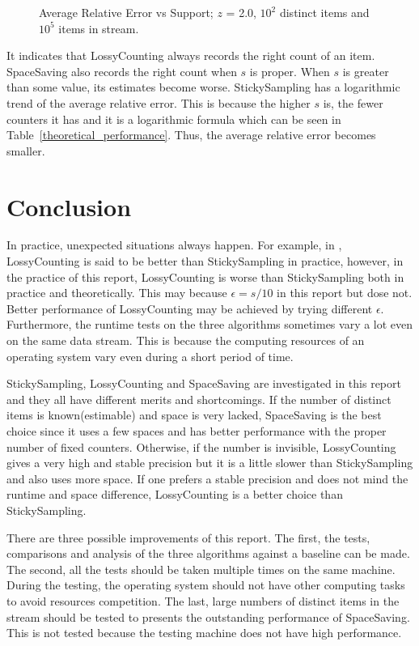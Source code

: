 \documentclass[10pt]{article}
\begin{document}
 \begin{figure}[H]
      \centering
     \begin{subfigure}[b]{0.6\textwidth}
      \centering
      \end{subfigure}
      \caption{Average Relative Error vs Support; $z$ = 2.0, $10^2$ distinct items and $10^5$ items in stream.}  
      \label{AverageRelativeErrorSupport}
 \end{figure}
 It indicates that 
 LossyCounting always records the right count of an item.
 SpaceSaving also records the right count when $s$ is proper. 
 When $s$ is greater than some value, its estimates become worse.
 StickySampling has a logarithmic trend of the average relative error.
 This is because the higher $s$ is, the fewer counters it has 
 and it is a logarithmic formula which can be seen in Table~\ref{theoretical_performance}. 
 Thus, the average relative error becomes smaller.

 \section{Conclusion}\label{conclusion}
 In practice, unexpected situations always happen. 
 For example, in \cite{stickylossy}, LossyCounting is said to be better than StickySampling in practice,
 however, in the practice of this report, LossyCounting is worse than StickySampling both in practice and theoretically.
 This may because $\epsilon{} = s/10$ in this report but \cite{stickylossy} dose not. 
 Better performance of LossyCounting may be achieved by trying different $\epsilon$.
 Furthermore, the runtime tests on the three algorithms sometimes vary a lot even on the same data stream.
 This is because the computing resources of an operating system vary even during a short period of time.

 StickySampling, LossyCounting and SpaceSaving are investigated in this report and
 they all have different merits and shortcomings. 
 If the number of distinct items is known(estimable) and space is very lacked,
 SpaceSaving is the best choice since it uses a few spaces and has better performance with the proper number of fixed counters.
 Otherwise, if the number is invisible, LossyCounting gives a very high and stable precision but it is a little slower than StickySampling and also uses more space. If one prefers a stable precision and 
 does not mind the runtime and space difference, LossyCounting is a better choice than StickySampling.

 There are three possible improvements of this report. 
 The first, the tests, comparisons and analysis of the three algorithms against a baseline can be made.
 The second, all the tests should be taken multiple times on the same machine.
 During the testing, the operating system should not have other computing tasks to avoid resources competition.
 The last, large numbers of distinct items in the stream should be tested to presents the outstanding performance of SpaceSaving. This is not tested because the testing machine does not have high performance.
  
 \clearpage


\end{document}
